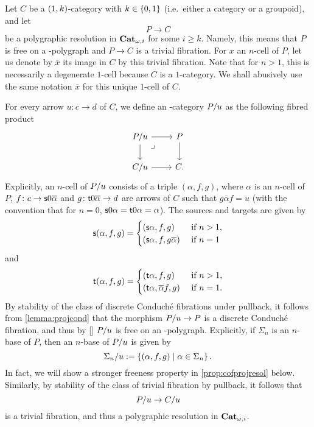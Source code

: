 \documentclass{amsart}
\newcommand{\src}[1]{\source{} #1}
\newcommand{\tgt}[1]{\target{} #1}
\renewcommand{\sce}[1]{\source{} #1}
\renewcommand{\tge}[1]{\target{} #1}
\begin{document}
  \begin{paragr}\label{paragr:slicepol}
    Let $C$ be a $(1,k)$\nbd-category with $k \in \left\{0,1\right\}$
    (i.e.\ either a category or a groupoid), and let
    \[
       P \to C
    \]
    be a polygraphic resolution in $\mathbf{Cat}_{\omega,i}$ for some $i \geq
    k$. Namely, this means that $P$ is free on a -polygraph and
    $P\to C$ is a trivial fibration. For $x$ an $n$\nbd-cell of $P$,
    let us denote by $\overline{x}$ its image in $C$ by this trivial
    fibration. Note that for $n>1$, this is necessarily a degenerate
    $1$\nbd-cell because $C$ is a $1$\nbd-category. We shall abusively
    use the
    same notation $\overline{x}$ for this unique $1$\nbd-cell of $C$.
  \end{paragr}
  \begin{paragr}
    For every arrow $u\colon c \to d$ of $C$, we define an
    \nbd-category $P/u$ as the following fibred product
    \[
      \begin{tikzcd}
        \tr{P}{u} \ar[r] \ar[d] & P \ar[d] \\
        \tr{C}{u} \ar[r] & C.
        \ar[from=1-1,to=2-2,phantom,"\lrcorner" very near start]
      \end{tikzcd}
    \]
    Explicitly, an $n$\nbd-cell of $P/u$ consists of a
      triple $(\alpha,f,g)$, where $\alpha$ is an $n$\nbd-cell of $P$,
      $f \colon c \to \src{0}\overline{\alpha}$ and $g \colon
      \tgt{0}\overline{\alpha}\to d$ are arrows of $C$ such that
      $g\overline{\alpha}f=u$ (with the convention that for $n=0$,
      $\src{0}\alpha=\tgt{0}\alpha=\alpha$). The sources
      and targets are given by
      \[
        \sce{(\alpha,f,g)}=\begin{cases}
          (\sce{}\alpha,f,g)& \text{ if } n>1, \\
          (\sce{}\alpha,f,g\overline{\alpha})& \text{ if } n=1
          \end{cases}
        \]
        and
        \[
          \tge{(\alpha,f,g)}=\begin{cases}
          (\tge{}\alpha,f,g)& \text{ if } n>1, \\
          (\tge{}\alpha,\overline{\alpha}f,g)& \text{ if } n=1.
          \end{cases}
        \]
    By stability of the class of discrete Conduché fibrations under
    pullback, it follows from \cref{lemma:projcond} that the morphism
    $P/u\to P$ is a discrete Conduché fibration, and thus by
    \ref{} $P/u$ is free on an
    \nbd-polygraph. Explicitly, if $\Sigma_n$ is an
    $n$\nbd-base of $P$, then an $n$\nbd-base of $P/u$ is given
    by
    \[
      \Sigma_n/u:=\left\{ (\alpha,f,g)\; | \; \alpha \in \Sigma_n\right\}.
    \]
    In fact,
    we will show a stronger freeness property in
    \cref{prop:cofprojresol} below. Similarly, by
    stability of the class of trivial fibration by pullback, it
    follows that \[P/u \to C/u\] is a trivial fibration,
    and thus a polygraphic resolution in $\mathbf{Cat}_{\omega,i}$.
  \end{paragr}
\end{document}
